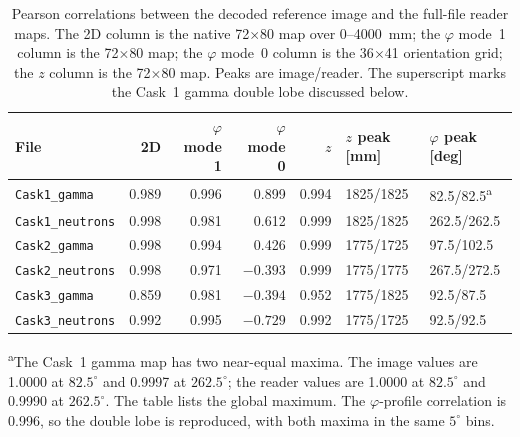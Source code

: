 \documentclass[11pt,a4paper]{article}
\begin{document}
\begin{table}[H]
\centering
\caption{Pearson correlations between the decoded reference image and the
full-file reader maps.  The 2D column is the native 72$\times$80 map over
0--4000~mm; the $\varphi$ mode~1 column is the 72$\times$80 map; the
$\varphi$ mode~0 column is the 36$\times$41 orientation grid; the $z$ column is
the 72$\times$80 map.  Peaks are image/reader.  The superscript marks the Cask~1
gamma double lobe discussed below.}
\label{tab:validation}
\footnotesize
\begin{tabular}{@{}l r r r r l l@{}}
\toprule
File & 2D & $\varphi$ mode 1 & $\varphi$ mode 0 & $z$
     & $z$ peak [mm] & $\varphi$ peak [deg] \\
\midrule
\texttt{Cask1\_gamma}    & 0.989 & 0.996 & 0.899 & 0.994 & 1825/1825 & 82.5/82.5\textsuperscript{a} \\
\texttt{Cask1\_neutrons} & 0.998 & 0.981 & 0.612 & 0.999 & 1825/1825 & 262.5/262.5 \\
\texttt{Cask2\_gamma}    & 0.998 & 0.994 & 0.426 & 0.999 & 1775/1725 & 97.5/102.5 \\
\texttt{Cask2\_neutrons} & 0.998 & 0.971 & $-0.393$ & 0.999 & 1775/1775 & 267.5/272.5 \\
\texttt{Cask3\_gamma}    & 0.859 & 0.981 & $-0.394$ & 0.952 & 1775/1825 & 92.5/87.5 \\
\texttt{Cask3\_neutrons} & 0.992 & 0.995 & $-0.729$ & 0.992 & 1775/1725 & 92.5/92.5 \\
\bottomrule
\end{tabular}
\par\smallskip
\begin{minipage}{0.96\linewidth}
\footnotesize
\textsuperscript{a}The Cask~1 gamma map has two near-equal maxima.  The image
values are 1.0000 at $82.5^\circ$ and 0.9997 at $262.5^\circ$; the reader values
are 1.0000 at $82.5^\circ$ and 0.9990 at $262.5^\circ$.  The table lists the
global maximum.  The $\varphi$-profile correlation is 0.996, so the double lobe
is reproduced, with both maxima in the same $5^\circ$ bins.
\end{minipage}
\end{table}
\end{document}
